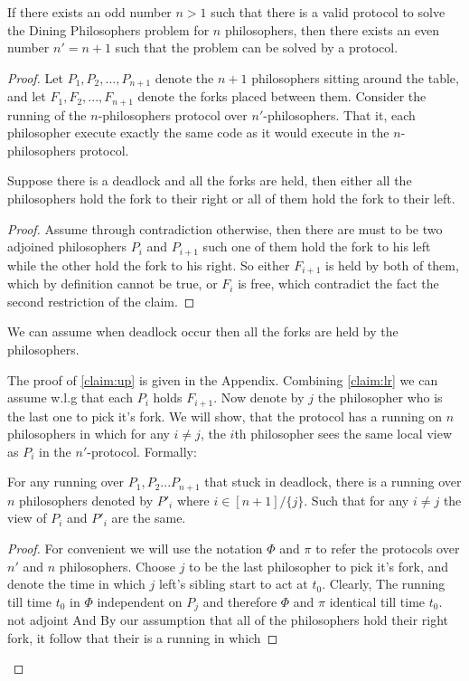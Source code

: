 \documentclass[manuscript,screen,review]{acmart}
\begin{document}
\begin{lemma} If there exists an odd number $n > 1$ such that there is a valid protocol to solve the Dining Philosophers problem for $n$ philosophers, then there exists an even number $n' = n+1$ such that the problem can be solved by a protocol.
\end{lemma}
\begin{proof}
  Let $P_1, P_2, ..., P_{n+1}$ denote the $n+1$ philosophers sitting around the table, and let $F_1, F_2, ..., F_{n+1}$ denote the forks placed between them. Consider the running of the $n$-philosophers protocol over $n'$-philosophers. That it, each philosopher execute exactly the same code as it would execute in the $n$-philosophers protocol. 

  \begin{claim} \label{claim:lr} 
Suppose there is a deadlock and all the forks are held, then either all the philosophers hold the fork to their right or all of them hold the fork to their left.
  \end{claim} 
  \begin{proof}
    Assume through contradiction otherwise, then there are must to be two adjoined philosophers $P_{i}$ and $P_{i+1}$ such one of them hold the fork to his left while the other hold the fork to his right. So either $F_{i+1}$ is held by both of them, which by definition cannot be true, or $F_{i}$ is free, which contradict the fact the second restriction of the claim. 
  \end{proof}
  \begin{claim} \label{claim:up} 
    We can assume when deadlock occur then all the forks are held by the philosophers. 
  \end{claim} 
  The proof of \cref{claim:up} is given in the Appendix. Combining \cref{claim:lr} we can assume w.l.g that each $P_{i}$ holds $F_{i+1}$. Now denote by $j$ the philosopher who is the last one to pick it's fork. We will show, that the protocol has a running on $n$ philosophers in which for any $i\neq j$, the $i$th philosopher sees the same local view as $P_{i}$ in the $n'$-protocol. Formally: 

  \begin{claim}
    For any running over $P_1, P_2 ... P_{n+1}$ that stuck in deadlock, there is a running over $n$ philosophers denoted by $P'_{i}$ where $i \in [n+1]/\{j\}$. Such that for any $i\neq j$ the view of $P_{i}$ and $P'_{i}$ are the same.     
  \end{claim}
 
  \begin{proof}
    For convenient we will use the notation $\Phi$ and $\pi$ to refer the protocols over $n'$ and $n$ philosophers. Choose $j$ to be the last philosopher to pick it's fork, and denote the time in which $j$ left's sibling start to act at $t_{0}$. Clearly, The running till time $t_{0}$ in $\Phi$  independent on $P_{j}$ and therefore $\Phi$ and $\pi$ identical till time $t_{0}$.  not adjoint  And By our assumption that all of the philosophers hold their right fork, it follow that their is a running in which 
  \end{proof}

\end{proof}
\end{document}
